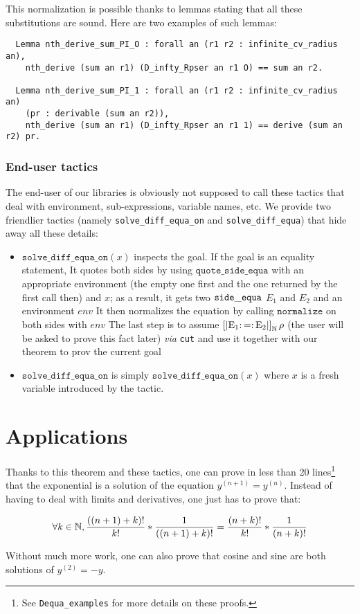 \documentclass{article}
\begin{document}
This normalization is possible thanks to lemmas stating that all these
substitutions are sound. Here are two examples of such lemmas:

\begin{verbatim}
  Lemma nth_derive_sum_PI_O : forall an (r1 r2 : infinite_cv_radius an),
    nth_derive (sum an r1) (D_infty_Rpser an r1 O) == sum an r2.

  Lemma nth_derive_sum_PI_1 : forall an (r1 r2 : infinite_cv_radius an)
    (pr : derivable (sum an r2)),
    nth_derive (sum an r1) (D_infty_Rpser an r1 1) == derive (sum an r2) pr.
\end{verbatim}

\subsubsection{End-user tactics}

The end-user of our libraries is obviously not supposed to call these tactics
that deal with environment, sub-expressions, variable names, etc. We provide two
friendlier tactics (namely \texttt{solve\_diff\_equa\_on} and
\texttt{solve\_diff\_equa}) that hide away all these details:

\begin{itemize}
\item $\mathtt{solve\_diff\_equa\_on}(x)$ inspects the goal. If the goal is an
equality statement,
  \subitem It quotes both sides by using $\mathtt{quote\_side\_equa}$ with an
  appropriate environment (the empty one first and the one returned by the first
  call then) and $x$; as a result, it gets two $\operatorname{\mathtt{side\_equa}}$ $E_1$ and $E_2$ and an
  environment $env$
  \subitem It then normalizes the equation by calling $\mathtt{normalize}$ on
  both sides with $env$
  \subitem The last step is to assume $\operatorname{\operatorname{\left[\left| E_1 :=: E_2 \right|\right]}_{\mathbb{N}} \rho}$ (the user will be asked to prove
  this fact later) \textit{via} \texttt{cut} and use it together with our
  theorem to prov the current goal
\item $\mathtt{solve\_diff\_equa\_on}$  is simply
  $\mathtt{solve\_diff\_equa\_on}(x)$  where $x$ is a fresh variable introduced
  by the tactic.
\end{itemize}

\section{Applications}

Thanks to this theorem and these tactics, one can prove in less than 20
lines\footnote{See \texttt{Dequa\_examples} for more details on these proofs.}
that the exponential is a solution of the equation $y^{(n+1)} = y^{(n)}$. Instead
of having to deal with limits and derivatives, one just has to prove that:

$$\forall k \in \mathbb{N}, \frac{((n+1) + k)!}{k!} * \frac{1}{((n+1)+k)!}
= \frac{(n+k)!}{k!} * \frac{1}{(n+k)!}$$

Without much more work, one can also prove that cosine and sine are
both solutions of $y^{(2)} = - y$.

\printbibliography{}


\end{document}
